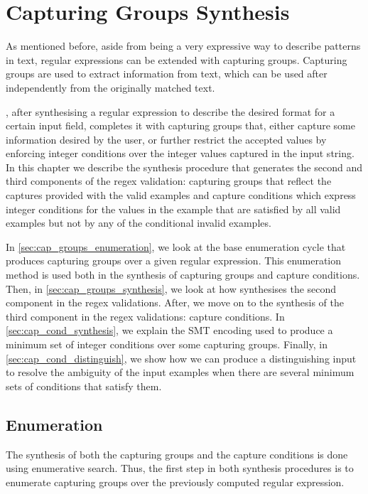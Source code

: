 \chapter{Capturing Groups Synthesis}\label{chap:capture-cond-synthesis}

As mentioned before, aside from being a very expressive way to describe patterns in text, regular expressions can be extended with capturing groups.
%
Capturing groups are used to extract information from text, which can be used after independently from the originally matched text.

\Forest, after synthesising a regular expression to describe the desired format for a certain input field, completes it with capturing groups that, either capture some information desired by the user, or further restrict the accepted values by enforcing integer conditions over the integer values captured in the input string.
%
In this chapter we describe the synthesis procedure that generates the second and third components of the regex validation: capturing groups that reflect the captures provided with the valid examples and capture conditions which express integer conditions for the values in the example that are satisfied by all valid examples but not by any of the conditional invalid examples.

In \autoref{sec:cap_groups_enumeration}, we look at the base enumeration cycle that produces capturing groups over a given regular expression. This enumeration method is used both in the synthesis of capturing groups and capture conditions. Then, in \autoref{sec:cap_groups_synthesis}, we look at how \Forest synthesises the second component in the regex validations. After, we move on to the synthesis of the third component in the regex validations: capture conditions. In \autoref{sec:cap_cond_synthesis}, we explain the SMT encoding used to produce a minimum set of integer conditions over some capturing groups. Finally, in \autoref{sec:cap_cond_distinguish}, we show how we can produce a distinguishing input to resolve the ambiguity of the input examples when there are several minimum sets of conditions that satisfy them.

    
\section{Enumeration}\label{sec:cap_groups_enumeration}
The synthesis of both the capturing groups and the capture conditions is done using enumerative search. Thus, the first step in both synthesis procedures is to enumerate capturing groups over the previously computed regular expression.

